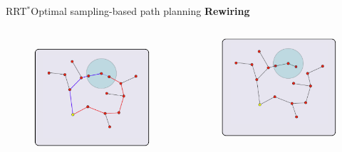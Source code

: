 \begin{frame}{RRT$^{*}$}{Optimal sampling-based path planning}
{\Large \textbf{Rewiring}}
\begin{columns}
	\begin{figure}
		\centering
		\includegraphics[width=\linewidth]{figure/RRTs06.png}
		\label{fig:rrts:06}
	\end{figure}
	\begin{figure}
		\centering
		\includegraphics[width=\linewidth]{figure/RRTs07.png}

\end{figure}
\end{columns}
\end{frame}
